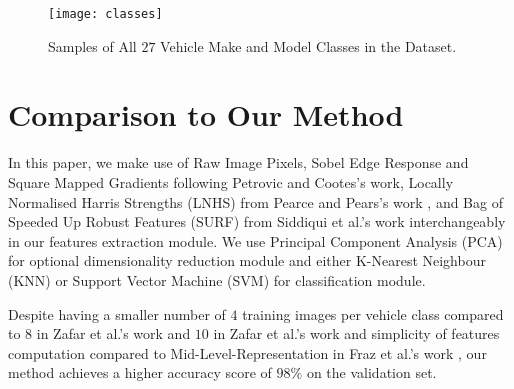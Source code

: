 \begin{figure}
\centering
\texttt{[image: classes]}
\caption{Samples of All $27$ Vehicle Make and Model Classes in the Dataset.}
\label{fig:classes}
\end{figure}

\section{Comparison to Our Method}

In this paper, we make use of 
Raw Image Pixels, Sobel Edge Response and Square Mapped Gradients following Petrovic and Cootes's \citep{petrovic2004analysis} work, 
Locally Normalised Harris Strengths (LNHS) from Pearce and Pears's work \citep{pearce2011automatic}, and 
Bag of Speeded Up Robust Features (SURF) from Siddiqui et al.'s work \citep{siddiqui2016real} 
interchangeably in our features extraction module.
We use Principal Component Analysis (PCA) for optional dimensionality reduction module and either 
K-Nearest Neighbour (KNN) or
Support Vector Machine (SVM) for classification module.

Despite having a smaller number of $4$ training images per vehicle class compared to $8$ in Zafar et al.'s work \citep{zafar2007two} and $10$ in Zafar et al.'s work \citep{zafar2009localized} and simplicity of features computation compared to Mid-Level-Representation in Fraz et al.'s work \citep{fraz2014mid}, our method achieves a higher accuracy score of $98\%$ on the validation set.






